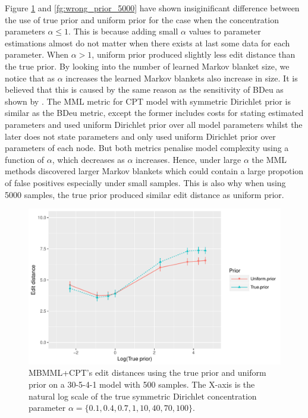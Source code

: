 Figure \ref{fg:wrong_prior_500} and \ref{fg:wrong_prior_5000} have shown insiginificant difference between the use of true prior and uniform prior for the case when the concentration parameters $\alpha \le 1$. This is because adding small $\alpha$ values to parameter estimations almost do not matter when there exists at last some data for each parameter. When $\alpha > 1$, uniform prior produced slightly less edit distance than the true prior. By looking into the number of learned Markov blanket size, we notice that as $\alpha$ increases the learned Markov blankets also increase in size. It is believed that this is caused by the same reason as the sensitivity of BDeu as shown by \cite{silander2007sensitivity}. The MML metric for CPT model with symmetric Dirichlet prior is similar as the BDeu metric, except the former includes costs for stating estimated parameters and used uniform Dirichlet prior over all model parameters whilst the later does not state parameters and only used uniform Dirichlet prior over parameters of each node. But both metrics penalise model complexity using a function of $\alpha$, which decreases as $\alpha$ increases. Hence, under large $\alpha$ the MML methods discovered larger Markov blankets which could contain a large propotion of false positives especially under small samples. This is also why when using 5000 samples, the true prior produced similar edit distance as uniform prior.

\begin{figure}[H]
  \centering
    \includegraphics[scale=0.6]{figures/ed_vs_trueprior_30_5_4_alpha_134445_500.pdf}
  \caption{MBMML+CPT's edit distances using the true prior and uniform prior on a 30-5-4-1 model with 500 samples. The X-axis is the natural log scale of the true symmetric Dirichlet concentration parameter $\alpha = \{0.1, 0.4, 0.7, 1, 10, 40, 70, 100\}$.}
  \label{fg:wrong_prior_500}
\end{figure}

